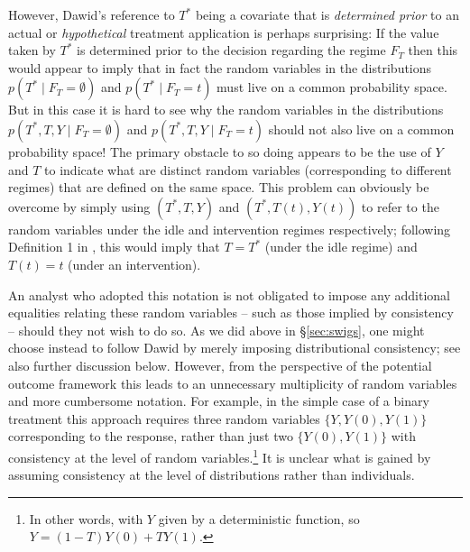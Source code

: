 \documentclass[11pt]{article}
\begin{document}
{However, Dawid's reference to $T^*$ being a covariate that is {\it determined prior} to an actual or {\it hypothetical} treatment application is perhaps surprising: If the value taken by $T^*$ is determined prior to the decision regarding the regime $F_T$ then this would appear to imply that in fact the random variables in the distributions $p(T^* \mid F_T=\emptyset)$ and $p(T^* \mid F_T=t)$ must live on a common probability space. But in this case it is hard to see why the random variables in the distributions 
$p(T^*,T,Y \mid F_T=\emptyset)$ and  $p(T^*,T,Y \mid F_T=t)$ should not also live on a common probability space! The primary obstacle to so doing appears to be the use of $Y$ and $T$ to indicate what are distinct random variables (corresponding to different regimes) that are defined on the same space. This problem can obviously be overcome by simply using $(T^*,T,Y)$ and $(T^*, T(t), Y(t))$ to refer to the random variables under the idle and intervention regimes respectively; following Definition 1 in \citep{dawid:2021}, this would imply that $T=T^*$ (under the idle regime) and $T(t) = t$ (under an intervention). 

An analyst who adopted this notation is not obligated to impose any additional equalities relating these random variables -- such as those implied by consistency -- should they not wish to do so. As we did above in \S\ref{sec:swigs}, one might choose instead to follow Dawid by merely imposing distributional consistency; see also further discussion below. 
However, from the perspective of the potential outcome framework this leads to an unnecessary multiplicity of random variables and more cumbersome notation.
For example, in the simple case of a binary treatment this approach requires three random variables $\{Y,Y(0),Y(1)\}$ corresponding to the response, rather than just two $\{Y(0),Y(1)\}$ with consistency at the level of random variables.\footnote{In other words, with $Y$ given by a deterministic function, so $Y=(1-T)Y(0)+TY(1)$.} It is unclear what is gained by assuming consistency at the level of distributions rather than individuals.

}
\end{document}
